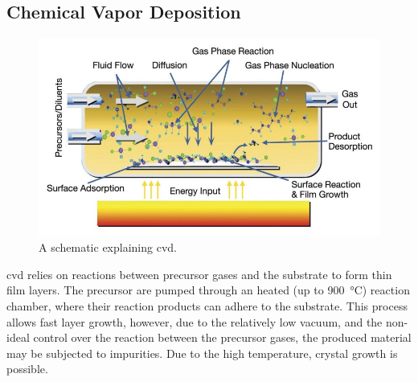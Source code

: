 \subsection{Chemical Vapor Deposition}
\begin{figure}
    \includegraphics[width=\textwidth]{03_fabrication/fig/chemical_vapor_deposition.jpg}
    \caption{A schematic explaining \gls{cvd}\cite{cvd}.}
    \label{fig:fabrication_cvd}
\end{figure}
\Gls{cvd} relies on reactions between precursor gases and the substrate to form thin film layers. The precursor are pumped through an heated (up to \SI{900}{\celsius}) reaction chamber, where their reaction products can adhere to the substrate. This process allows fast layer growth, however, due to the relatively low vacuum, and the non-ideal control over the reaction between the precursor gases, the produced material may be subjected to impurities. Due to the high temperature, crystal growth is possible.
